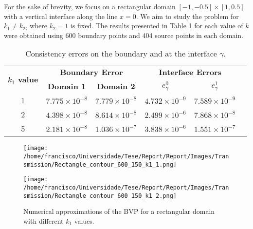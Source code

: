 \documentclass[5p,authoryear]{elsarticle}
\begin{document}
For the sake of brevity, we focus on a rectangular domain \([-1, -0.5] \times [1, 0.5]\) with a vertical interface along the line \(x=0\). We aim to study the problem for \(k_1 \neq k_2\), where \(k_2=1\) is fixed. The results presented in Table \ref{tab:transmission_results_rectangle} for each value of \(k\) were obtained using 600 boundary points and 404 source points in each domain.
\begin{table}
    \centering
    \footnotesize %
    \setlength{\tabcolsep}{1pt} %
    \begin{tabular}{@{}cccccc@{}}
      \toprule
      \multirow{2}{*}{\textbf{\(k_1\) value}} & \multicolumn{2}{c}{\textbf{Boundary Error}} & \multicolumn{2}{c}{\textbf{Interface Errors}} \\
      \cmidrule(lr){2-3} \cmidrule(lr){4-5}
      & \textbf{Domain 1} & \textbf{Domain 2} & \textbf{\(e_\gamma^0\)} & \textbf{\(e_\gamma^1\)} & \\
      \midrule
      1 & $7.775\times10^{-8}$ & $7.779\times10^{-8}$ & $4.732\times10^{-9}$ & $7.589\times10^{-9}$\\
      2 & $4.398\times10^{-8}$ & $8.614\times10^{-8}$ & $2.499\times10^{-6}$ & $7.868\times10^{-8}$\\
      5 & $2.181\times10^{-8}$ & $1.036\times10^{-7}$ & $3.838\times10^{-6}$ & $1.551\times10^{-7}$\\
      \bottomrule
    \end{tabular}
    \caption{Consistency errors on the boundary and at the interface \(\gamma\).}
    \label{tab:transmission_results_rectangle}
\end{table}
\begin{figure}
    \centering
    \begin{minipage}{.25\textwidth}
      \centering
      \texttt{[image: /home/francisco/Universidade/Tese/Report/Report/Images/Transmission/Rectangle\_contour\_600\_150\_k1\_1.png]}
      \captionsetup{width=0.8\linewidth} %
      \label{transmission_rectangle_plot_k1_1}
    \end{minipage}%
    \begin{minipage}{.25\textwidth}
      \centering
      \texttt{[image: /home/francisco/Universidade/Tese/Report/Report/Images/Transmission/Rectangle\_contour\_600\_150\_k1\_2.png]}
      \captionsetup{width=0.8\linewidth} %
      \label{transmission_rectangle_plot_k1_2}
    \end{minipage}
    \caption*{Numerical approximations of the BVP for a rectangular domain with different \(k_1\) values.}
    \label{transmission_rectangle_plots}
\end{figure}
\end{document}
